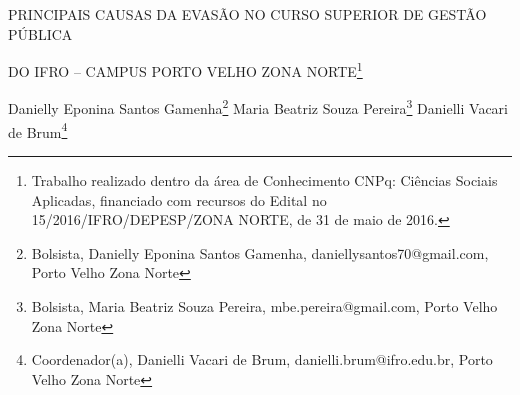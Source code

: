 \documentclass[article,12pt,onesidea,4paper,english,brazil]{abntex2}
\begin{document}
	
	
	\frenchspacing 
	
	\begin{center}
		\LARGE PRINCIPAIS CAUSAS DA EVASÃO NO CURSO SUPERIOR DE GESTÃO PÚBLICA
		
		DO IFRO – CAMPUS PORTO VELHO ZONA NORTE\footnote{
			Trabalho realizado dentro da área de Conhecimento CNPq: Ciências Sociais Aplicadas, financiado
			com recursos do Edital no 15/2016/IFRO/DEPESP/ZONA NORTE, de 31 de maio de 2016.}
		
		\normalsize
		Danielly Eponina Santos Gamenha\footnote{Bolsista, Danielly Eponina Santos Gamenha, daniellysantos70@gmail.com, Porto Velho Zona Norte} 
		Maria Beatriz Souza Pereira\footnote{Bolsista, Maria Beatriz Souza Pereira, mbe.pereira@gmail.com, Porto Velho Zona Norte} 
		Danielli Vacari de Brum\footnote{Coordenador(a), Danielli Vacari de Brum, danielli.brum@ifro.edu.br, Porto Velho Zona Norte} 
		 
	\end{center}
	
\end{document}
